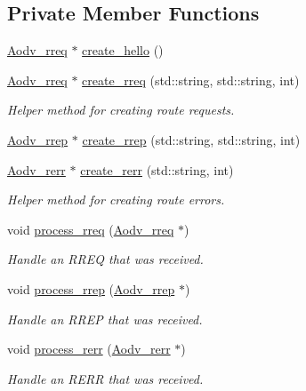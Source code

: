 \subsection*{Private Member Functions}
\begin{DoxyCompactItemize}
\item 
\hyperlink{class_aodv__rreq}{Aodv\+\_\+rreq} $\ast$ \hyperlink{class_aodv_ade268f2a97b85ac093a12f54c6e2502d}{create\+\_\+hello} ()
\item 
\hyperlink{class_aodv__rreq}{Aodv\+\_\+rreq} $\ast$ \hyperlink{class_aodv_aed7138e98e455a1e6092e532d0edbc64}{create\+\_\+rreq} (std\+::string, std\+::string, int)
\begin{DoxyCompactList}\small\item\em Helper method for creating route requests. \end{DoxyCompactList}\item 
\hyperlink{class_aodv__rrep}{Aodv\+\_\+rrep} $\ast$ \hyperlink{class_aodv_a0d0cd08b2f2cba22b946993232621675}{create\+\_\+rrep} (std\+::string, std\+::string, int)
\item 
\hyperlink{class_aodv__rerr}{Aodv\+\_\+rerr} $\ast$ \hyperlink{class_aodv_abceee516026d09c5f229ede0d7fbcaf2}{create\+\_\+rerr} (std\+::string, int)
\begin{DoxyCompactList}\small\item\em Helper method for creating route errors. \end{DoxyCompactList}\item 
void \hyperlink{class_aodv_ae4b13d93f038025b221f9fe58c7b4076}{process\+\_\+rreq} (\hyperlink{class_aodv__rreq}{Aodv\+\_\+rreq} $\ast$)
\begin{DoxyCompactList}\small\item\em Handle an R\+R\+EQ that was received. \end{DoxyCompactList}\item 
void \hyperlink{class_aodv_abb693706e2ecc1a07c42e24a34cb2084}{process\+\_\+rrep} (\hyperlink{class_aodv__rrep}{Aodv\+\_\+rrep} $\ast$)
\begin{DoxyCompactList}\small\item\em Handle an R\+R\+EP that was received. \end{DoxyCompactList}\item 
void \hyperlink{class_aodv_acf63f922992a00a596237102ae8f2e1a}{process\+\_\+rerr} (\hyperlink{class_aodv__rerr}{Aodv\+\_\+rerr} $\ast$)
\begin{DoxyCompactList}\small\item\em Handle an R\+E\+RR that was received. \end{DoxyCompactList}\item 

\end{DoxyCompactItemize}

